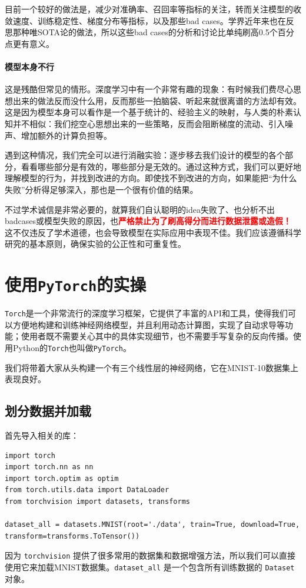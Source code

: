 目前一个较好的做法是，减少对准确率、召回率等指标的关注，转而关注模型的收敛速度、训练稳定性、梯度分布等指标，以及那些bad cases。学界近年来也在反思那种唯SOTA论的做法，所以这些bad cases的分析和讨论比单纯刷高0.5个百分点更有意义。

\paragraph{模型本身不行} 这是残酷但常见的情形。深度学习中有一个非常有趣的现象：有时候我们费尽心思想出来的做法反而没什么用，反而那些一拍脑袋、听起来就很离谱的方法却有效。这是因为模型本身可以看作是一个基于统计的、经验主义的映射，与人类的朴素认知并不相似：我们挖空心思想出来的一些策略，反而会阻断梯度的流动、引入噪声、增加额外的计算负担等。

遇到这种情况，我们完全可以进行消融实验：逐步移去我们设计的模型的各个部分，看看哪些部分是有效的，哪些部分是无效的。通过这种方式，我们可以更好地理解模型的行为，并找到改进的方向。即使找不到改进的方向，如果能把“为什么失败”分析得足够深入，那也是一个很有价值的结果。

不过学术诚信是非常必要的，就算我们自认聪明的idea失败了、也分析不出badcases或模型失败的原因，也\textcolor{red}{\bfseries 严格禁止为了刷高得分而进行数据泄露或造假！} 这不仅违反了学术道德，也会导致模型在实际应用中表现不佳。我们应该遵循科学研究的基本原则，确保实验的公正性和可重复性。

\section{使用\texttt{PyTorch}的实操}

\texttt{Torch}是一个非常流行的深度学习框架，它提供了丰富的API和工具，使得我们可以方便地构建和训练神经网络模型，并且利用动态计算图，实现了自动求导等功能；使用者既不需要关心其中的具体实现细节，也不需要手写复杂的反向传播。使用Python的\texttt{Torch}也叫做\texttt{PyTorch}。

我们将带着大家从头构建一个有三个线性层的神经网络，它在MNIST-10数据集上表现良好。

\subsection{划分数据并加载}

首先导入相关的库：
\begin{verbatim}
import torch
import torch.nn as nn
import torch.optim as optim
from torch.utils.data import DataLoader
from torchvision import datasets, transforms

dataset_all = datasets.MNIST(root='./data', train=True, download=True, transform=transforms.ToTensor())
\end{verbatim}
因为 \texttt{torchvision} 提供了很多常用的数据集和数据增强方法，所以我们可以直接使用它来加载MNIST数据集。\texttt{dataset_all} 是一个包含所有训练数据的 \texttt{Dataset} 对象。

